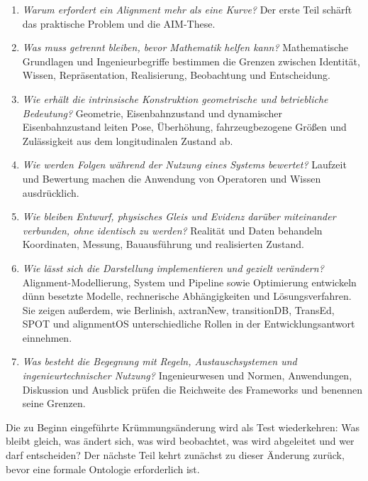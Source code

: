 \begin{enumerate}[leftmargin=*]
\item \emph{Warum erfordert ein Alignment mehr als eine Kurve?} Der erste Teil
  schärft das praktische Problem und die AIM-These.
\item \emph{Was muss getrennt bleiben, bevor Mathematik helfen kann?}
  Mathematische Grundlagen und Ingenieurbegriffe bestimmen die Grenzen
  zwischen Identität, Wissen, Repräsentation, Realisierung, Beobachtung und
  Entscheidung.
\item \emph{Wie erhält die intrinsische Konstruktion geometrische und
  betriebliche Bedeutung?} Geometrie, Eisenbahnzustand und dynamischer
  Eisenbahnzustand leiten Pose, Überhöhung, fahrzeugbezogene Größen und
  Zulässigkeit aus dem longitudinalen Zustand ab.
\item \emph{Wie werden Folgen während der Nutzung eines Systems bewertet?}
  Laufzeit und Bewertung machen die Anwendung von Operatoren und Wissen
  ausdrücklich.
\item \emph{Wie bleiben Entwurf, physisches Gleis und Evidenz darüber
  miteinander verbunden, ohne identisch zu werden?} Realität und Daten
  behandeln Koordinaten, Messung, Bauausführung und realisierten Zustand.
\item \emph{Wie lässt sich die Darstellung implementieren und gezielt
  verändern?} Alignment-Modellierung, System und Pipeline sowie Optimierung
  entwickeln dünn besetzte Modelle, rechnerische Abhängigkeiten und
  Lösungsverfahren. Sie zeigen außerdem, wie Berlinish, axtranNew,
  transitionDB, TransEd, SPOT und alignmentOS unterschiedliche Rollen in der
  Entwicklungsantwort einnehmen.
\item \emph{Was besteht die Begegnung mit Regeln, Austauschsystemen und
  ingenieurtechnischer Nutzung?} Ingenieurwesen und Normen, Anwendungen,
  Diskussion und Ausblick prüfen die Reichweite des Frameworks und benennen
  seine Grenzen.
\end{enumerate}

Die zu Beginn eingeführte Krümmungsänderung wird als Test wiederkehren: Was
bleibt gleich, was ändert sich, was wird beobachtet, was wird abgeleitet und
wer darf entscheiden? Der nächste Teil kehrt zunächst zu dieser Änderung
zurück, bevor eine formale Ontologie erforderlich ist.
